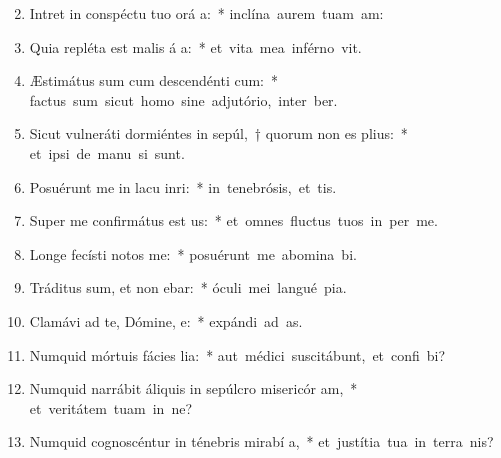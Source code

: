 \begin{flushleft}
\begin{enumerate}[leftmargin=*]
\setcounter{enumi}{1}

\item Intret in conspéctu tuo orá a:~* \mbox{inclína aurem tuam   am:}
\item Quia repléta est malis á a:~* \mbox{et vita mea inférno vit.}
\item Æstimátus sum cum descendénti  cum:~* \mbox{factus sum sicut homo sine adjutório, inter  ber.}
\item Sicut vulneráti dormiéntes in sepúl,~† quorum non es  plius:~* \mbox{et ipsi de manu  si sunt.}
\item Posuérunt me in lacu inri:~* \mbox{in tenebrósis, et   tis.}
\item Super me confirmátus est  us:~* \mbox{et omnes fluctus tuos in per me.}
\item Longe fecísti notos   me:~* \mbox{posuérunt me abomina bi.}
\item Tráditus sum, et non ebar:~* \mbox{óculi mei langué  pia.}
\item Clamávi ad te, Dómine,  e:~* \mbox{expándi ad   as.}
\item Numquid mórtuis fácies lia:~* \mbox{aut médici suscitábunt, et confi bi?}
\item Numquid narrábit áliquis in sepúlcro misericór am,~* \mbox{et veritátem tuam in ne?}
\item Numquid cognoscéntur in ténebris mirabí a,~* \mbox{et justítia tua in terra nis?}

\end{enumerate}
\end{flushleft}
